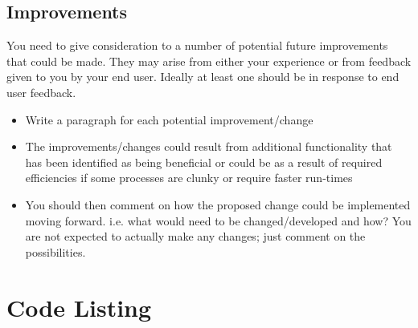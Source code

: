 \documentclass{article}
\begin{document}
\subsection{Improvements}

You need to give consideration to a number of potential future improvements that could be made. They may arise from either your experience or from feedback given to you by your end user. Ideally at least one should be in response to end user feedback.

\begin{itemize}
    \item Write a paragraph for each potential improvement/change
    \item The improvements/changes could result from additional functionality that has been identified as being beneficial or could be as a result of required efficiencies if some processes are clunky or require faster run-times
    \item You should then comment on how the proposed change could be implemented moving forward. i.e. what would need to be changed/developed and how? You are not expected to actually make any changes; just comment on the possibilities.
\end{itemize}

\section{Code Listing}
\end{document}
